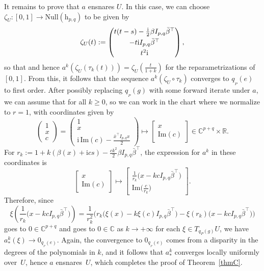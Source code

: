 \documentclass[10pt,a4paper]{amsart}
\numberwithin{equation}{section}
\theoremstyle{definition}
\begin{document}
It remains to prove that $a$ ensnares $U$. In this case, we can choose $\zeta_U\colon [0,1]\to\mathrm{Null}(\mathrm{h}_{p,q})$ to be given by
\[\zeta_U(t):=\begin{pmatrix}t(t-s)-\tfrac{\mathrm{i}}{2}\beta I_{p,q}\bar{\beta}^\top \vspace{1mm}\\ -t\mathrm{i}I_{p,q}\bar{\beta}^\top \vspace{1mm}\\ t^2\mathrm{i}\end{pmatrix},\]
so that  and hence $a^k(\zeta_U(\tau_k(t)))=\zeta_U(\tfrac{t}{1+k})$ for the reparametrizations  of $[0,1]$. From this, it follows that the sequence $a^k(\zeta_U\circ\tau_k)$ converges to $q_{{}_P}(e)$ to first order. After possibly replacing $q_{{}_P}(g)$ with some forward iterate under $a$, we can assume that  for all $k\geq 0$, so we can work in the chart where we normalize to $r=1$, with coordinates given by \[\begin{pmatrix}1 \\ x \\ c\end{pmatrix}=\begin{pmatrix}1 \\ x \\ \mathrm{i}\,\mathrm{Im}(c)-\tfrac{\bar{x}^\top I_{p,q}x}{2}\end{pmatrix}\mapsto\begin{bmatrix}x \\ \mathrm{Im}(c)\end{bmatrix}\in\mathbb{C}^{p+q}\times\mathbb{R}.\]
For $r_k:=1+k(\beta(x)+\mathrm{i}cs)-\tfrac{ck^2}{2}\beta I_{p,q}\bar{\beta}^\top$, the expression for $a^k$ in these coordinates is \[\begin{bmatrix}x \\ \mathrm{Im}(c)\end{bmatrix}\mapsto\begin{bmatrix}\tfrac{1}{r_k}\bigl(x-kcI_{p,q}\bar{\beta}^\top\bigr) \\ \mathrm{Im}\bigl(\tfrac{c}{r_k}\bigr)\end{bmatrix}.\] Therefore, since
\[\xi\left(\frac{1}{r_k}\bigl(x-kcI_{p,q}\bar{\beta}^\top\bigr)\right)
=\frac{1}{r_k^2}\bigl(r_k\bigl(\xi(x)-k\xi(c)I_{p,q}\bar{\beta}^\top\bigr) -\xi(r_k)\bigl(x-kcI_{p,q}\bar{\beta}^\top\bigr)\bigr)\] goes to $0\in\mathbb{C}^{p+q}$ and  goes to $0\in\mathbb{C}$ as $k\rightarrow+\infty$ for each $\xi\in T_{q_P(g)}U$, we have $a^k_*(\xi)\rightarrow 0_{q_{{}_P}(e)}$. Again, the convergence to $0_{q_{{}_P}(e)}$ comes from a disparity in the degrees of the polynomials in $k$, and it follows that $a^k_*$ converges locally uniformly over~$U$, hence $a$ ensnares~$U$, which completes the proof of Theorem~\ref{thmC}.
\end{document}
